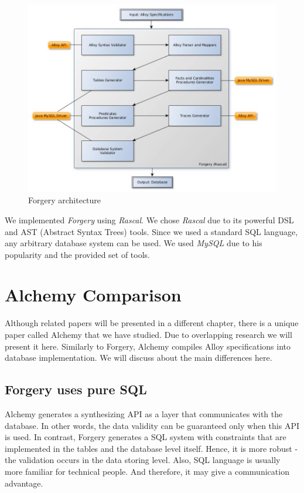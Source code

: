 \documentclass[oneside]{book}
\begin{document}
\begin{figure}[h!]
\centering
\includegraphics[scale=0.45]{forgery}
\caption{Forgery architecture}
\end{figure}

We implemented \textit{Forgery} using \textit{Rascal}. We chose \textit{Rascal} due to its powerful DSL and AST (Abstract Syntax Trees) tools. Since we used a standard SQL language, any arbitrary database system can be used. We used \textit{MySQL} due to his popularity and the provided set of tools.

\newpage

\section{Alchemy Comparison}
Although related papers will be presented in a different chapter, there is a unique paper called Alchemy \cite{alchemy} that we 
have studied. Due to overlapping research we will present it here. Similarly to Forgery, Alchemy compiles Alloy specifications into database implementation. We will discuss about the main differences here.\\

\subsection{Forgery uses pure SQL}
Alchemy generates a synthesizing API as a layer that communicates with the database. In other words, the data validity can be guaranteed only when this API is used. In contrast, Forgery generates a SQL system with constraints that are implemented in the tables and the database level itself. Hence, it is more robust - the validation occurs in the data storing level. Also, SQL language is usually more familiar for technical people. And therefore, it may give a communication advantage.\\
\end{document}
